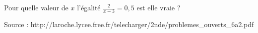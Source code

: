 
Pour quelle valeur de $x$ l'égalité $\frac{2}{x-3}=0,5$ est elle vraie ? 

\hfill{{\scriptsize Source : http://laroche.lycee.free.fr/telecharger/2nde/problemes\_ouverts\_6a2.pdf}}